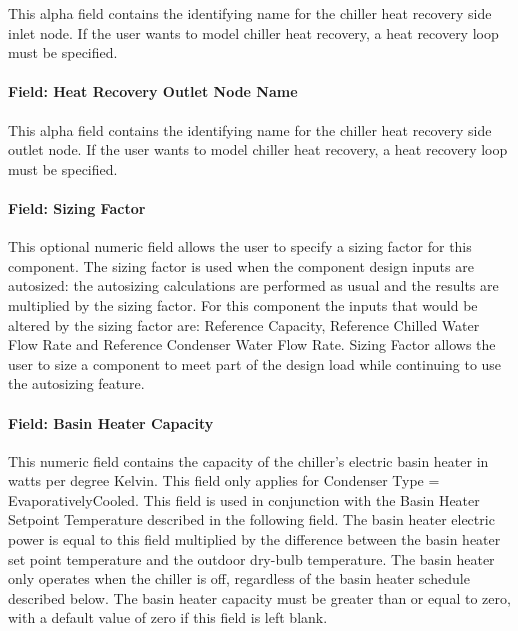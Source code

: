 This alpha field contains the identifying name for the chiller heat recovery side inlet node. If the user wants to model chiller heat recovery, a heat recovery loop must be specified.

\paragraph{Field: Heat Recovery Outlet Node Name}\label{field-heat-recovery-outlet-node-name-1-000}

This alpha field contains the identifying name for the chiller heat recovery side outlet node. If the user wants to model chiller heat recovery, a heat recovery loop must be specified.

\paragraph{Field: Sizing Factor}\label{field-sizing-factor-4-000}

This optional numeric field allows the user to specify a sizing factor for this component. The sizing factor is used when the component design inputs are autosized: the autosizing calculations are performed as usual and the results are multiplied by the sizing factor. For this component the inputs that would be altered by the sizing factor are: Reference Capacity, Reference Chilled Water Flow Rate and Reference Condenser Water Flow Rate. Sizing Factor allows the user to size a component to meet part of the design load while continuing to use the autosizing feature.

\paragraph{Field: Basin Heater Capacity}\label{field-basin-heater-capacity-2-001}

This numeric field contains the capacity of the chiller's electric basin heater in watts per degree Kelvin. This field only applies for Condenser Type = EvaporativelyCooled. This field is used in conjunction with the Basin Heater Setpoint Temperature described in the following field. The basin heater electric power is equal to this field multiplied by the difference between the basin heater set point temperature and the outdoor dry-bulb temperature. The basin heater only operates when the chiller is off, regardless of the basin heater schedule described below. The basin heater capacity must be greater than or equal to zero, with a default value of zero if this field is left blank.

